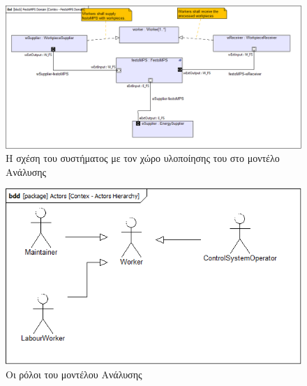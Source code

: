 \documentclass[a4paper,12pt,twoside]{report}
\begin{document}
{\begin{appendices}
				\begin{figure}[hp]
					\centering
					\includegraphics[scale=0.30]{AnalysisModel_Contex-FestoMPSDomain.png}
					\caption{Η σχέση του συστήματος με τον χώρο υλοποίησης του στο μοντέλο Ανάλυσης}
					\label{φωτ:Η σχέση του συστήματος με τον χώρο υλοποίησης του στο μοντέλο Ανάλυσης}
				\end{figure}
				
				\begin{figure}[hp]
					\centering
					\includegraphics[scale=0.50]{AnalysisModel_Contex-ActorsHierarchy.png}
					\caption{Οι ρόλοι του μοντέλου Ανάλυσης}
					\label{φωτ:Οι ρόλοι του μοντέλου Ανάλυσης}
				\end{figure}
				

\end{appendices}}
\end{document}
